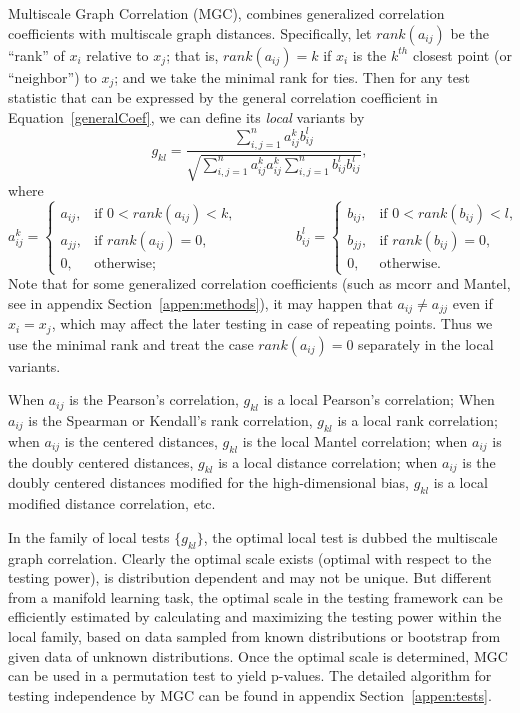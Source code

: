 \documentclass[11pt]{article}
\begin{document}
Multiscale Graph Correlation (MGC), combines generalized correlation coefficients with multiscale graph distances.  Specifically, let $rank(a_{ij})$  be the ``rank'' of $x_i$ relative to $x_j$; that is, $rank(a_{ij})=k$ if $x_i$ is the $k^{th}$ closest point (or ``neighbor'') to $x_j$; and we take the minimal rank for ties.  Then for any test statistic that can be expressed by the general correlation coefficient in Equation~\ref{generalCoef}, we can define its \emph{local} variants by
\begin{equation}
\label{localCoef}
g_{kl}=\frac{\sum_{i,j=1}^n a_{ij}^k b_{ij}^l}{\sqrt{\sum_{i,j=1}^n  a_{ij}^{k} a_{ij}^{k} \sum_{i,j=1}^n b_{ij}^{l} b_{ij}^{l}}},
\end{equation}
where
\begin{equation}
    a_{ij}^k=
    \begin{cases}
      a_{ij}, & \text{if } 0 < rank(a_{ij}) < k, \\
			a_{jj}, & \text{if } rank(a_{ij}) =0, \\
      0, & \text{otherwise};
    \end{cases} \qquad \qquad
    b_{ij}^l=
    \begin{cases}
      b_{ij}, & \text{if } 0 < rank(b_{ij}) < l, \\
			b_{jj}, & \text{if } rank(b_{ij}) =0, \\
      0, & \text{otherwise}.
    \end{cases}
\end{equation}
Note that for some generalized correlation coefficients (such as mcorr and Mantel, see in appendix Section~\ref{appen:methods}), it may happen that $a_{ij} \neq a_{jj}$ even if $x_{i}=x_{j}$, which may affect the later testing in case of repeating points. Thus we use the minimal rank and treat the case $rank(a_{ij})=0$ separately in the local variants.

When $a_{ij}$ is the Pearson's correlation, $g_{kl}$ is a local Pearson's correlation;
When $a_{ij}$ is the Spearman or Kendall's rank correlation, $g_{kl}$ is a local rank correlation;
when $a_{ij}$ is the centered distances, $g_{kl}$ is the local Mantel correlation;
when $a_{ij}$ is the doubly centered distances, $g_{kl}$ is a local distance correlation;
when $a_{ij}$ is the doubly centered distances modified for the high-dimensional bias, $g_{kl}$ is a local modified distance correlation, etc.

In the family of local tests $\{g_{kl}\}$, the optimal local test is dubbed the multiscale graph correlation. Clearly the optimal scale exists (optimal with respect to the testing power), is distribution dependent and may not be unique. But different from a manifold learning task, the optimal scale in the testing framework can be efficiently estimated by calculating and maximizing the testing power within the local family, based on data sampled from known distributions or bootstrap from given data of unknown distributions. Once the optimal scale is determined, MGC can be used in a permutation test to yield p-values. The detailed algorithm for testing independence by MGC can be found in appendix Section~\ref{appen:tests}.
\end{document}

